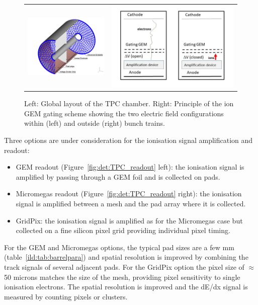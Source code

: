 \begin{figure}[t!]
\begin{tabular}{cc}
\includegraphics[width=0.6\hsize,viewport={0 -10 600 500},clip]{Detector/fig/TPC.png} &
\includegraphics[width=0.5\hsize]{Detector/fig/gate.jpg}
\end{tabular}
\caption[TPC layout]{Left: Global layout of the TPC chamber. Right: Principle of the ion GEM gating scheme showing the two electric field configurations within (left) and outside (right) bunch trains.}
\label{fig:det:TPC}
\end{figure}

Three options are under consideration for the ionisation signal amplification and readout:
\begin{itemize}
    \item GEM readout (Figure~\ref{fig:det:TPC_readout} left): the ionisation signal is amplified by passing through a GEM foil and is collected on pads.
    \item Micromegas readout (Figure~\ref{fig:det:TPC_readout} right): the ionisation signal is amplified between a mesh and the pad array where it is collected.
    \item GridPix: the ionisation signal is amplified as for the Micromegas case but collected on a fine silicon pixel grid providing individual pixel timing.
\end{itemize}
\vspace{0.5cm}
For the GEM and Micromegas options, the typical pad sizes are a few mm (table~\ref{ild:tab:barrelpara}) and spatial resolution is improved by combining the track signals of several adjacent pads. For the GridPix option the pixel size of $\approx$50 microns matches the size of the mesh, providing pixel sensitivity to single ionisation electrons. The spatial resolution is improved and the dE/dx signal is measured by counting pixels or clusters. 

